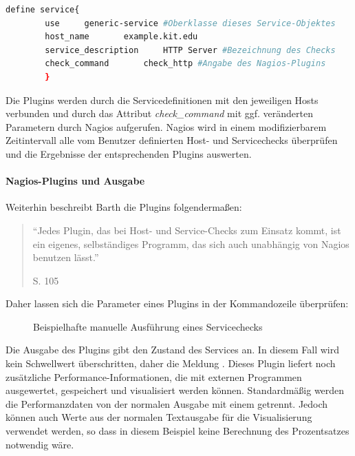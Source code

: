 \begin{lstlisting}[captionpos=b, caption=Verkürzte Definition eines Hostobjektes, label=servdef, breaklines = true, language=sh]
define service{
        use		generic-service #Oberklasse dieses Service-Objektes
        host_name		example.kit.edu
        service_description     HTTP Server #Bezeichnung des Checks
        check_command		check_http #Angabe des Nagios-Plugins
        }
\end{lstlisting}

Die Plugins werden durch die Servicedefinitionen mit den jeweiligen Hosts verbunden und durch das Attribut \textit{check\_command} mit ggf. veränderten Parametern durch Nagios aufgerufen.
Nagios wird in einem modifizierbarem Zeitintervall alle vom Benutzer definierten Host- und Servicechecks überprüfen und die Ergebnisse der entsprechenden Plugins auswerten.
\paragraph{Nagios-Plugins und Ausgabe}
Weiterhin beschreibt Barth die Plugins folgendermaßen:
\begin{quote}"`Jedes Plugin, das bei Host- und Service-Checks zum Einsatz kommt, ist ein eigenes, selbständiges Programm, das sich auch unabhängig von Nagios benutzen lässt."' \begin{flushright}\cite{Barth08} S. 105\end{flushright}\end{quote} 
Daher lassen sich die Parameter eines Plugins in der Kommandozeile überprüfen:

\begin{figure}[ht]
	\centering
		\caption{Beispielhafte manuelle Ausführung eines Servicechecks}
		\label{check-swap}
\end{figure}
\label{performanz}
Die Ausgabe des Plugins gibt den Zustand des Services an.
In diesem Fall wird kein Schwellwert überschritten, daher die Meldung .
Dieses Plugin liefert noch zusätzliche Performance-Informationen, die mit externen Programmen ausgewertet, gespeichert und visualisiert werden können.
Standardmäßig werden die Performanzdaten von der normalen Ausgabe mit einem \pictext{|} getrennt.
Jedoch können auch Werte aus der normalen Textausgabe für die Visualisierung verwendet werden, so dass in diesem Beispiel keine Berechnung des Prozentsatzes notwendig wäre.

